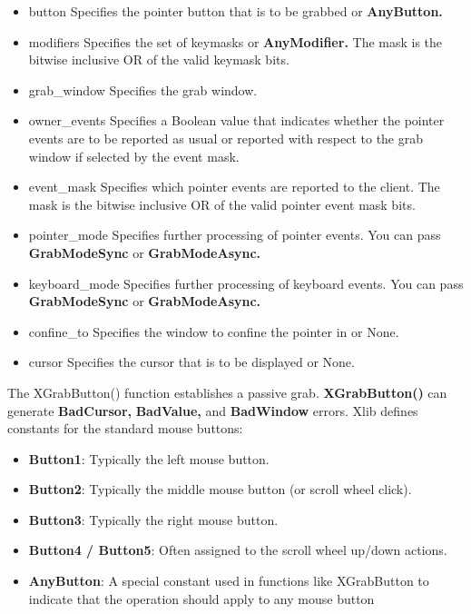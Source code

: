 \documentclass{report}
\begin{document}
\begin{itemize}
\begin{itemize}
                \item button	Specifies the pointer button that is to be grabbed or \textbf{AnyButton.}
                \item modifiers	Specifies the set of keymasks or \textbf{AnyModifier.} The mask is the bitwise inclusive OR of the valid keymask bits.
                \item grab\_window	Specifies the grab window.
                \item owner\_events	Specifies a Boolean value that indicates whether the pointer events are to be reported as usual or reported with respect to the grab window if selected by the event mask.
                \item event\_mask	Specifies which pointer events are reported to the client. The mask is the bitwise inclusive OR of the valid pointer event mask bits.
                \item pointer\_mode	Specifies further processing of pointer events. You can pass \textbf{GrabModeSync} or \textbf{GrabModeAsync.}
                \item keyboard\_mode	Specifies further processing of keyboard events. You can pass \textbf{GrabModeSync} or \textbf{GrabModeAsync.}
                \item confine\_to	Specifies the window to confine the pointer in or None.
                \item cursor	Specifies the cursor that is to be displayed or None.
            \end{itemize}
            The XGrabButton() function establishes a passive grab. \textbf{XGrabButton()} can generate \textbf{BadCursor,} \textbf{BadValue,} and \textbf{BadWindow} errors.
            \bigbreak \noindent 
            Xlib defines constants for the standard mouse buttons:
            \begin{itemize}
                \item \textbf{Button1}: Typically the left mouse button.
                \item \textbf{Button2}: Typically the middle mouse button (or scroll wheel click).
                \item \textbf{Button3}: Typically the right mouse button.
                \item \textbf{Button4 / Button5}: Often assigned to the scroll wheel up/down actions.
                \item \textbf{AnyButton}: A special constant used in functions like XGrabButton to indicate that the operation should apply to any mouse button

\end{itemize}
\end{itemize}
\end{document}
